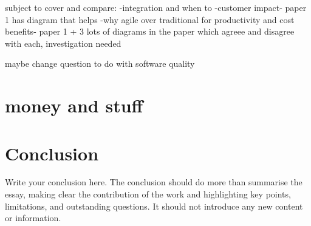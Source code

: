 \documentclass{scrartcl}
\begin{document}
 

subject to cover and compare:
-integration and when to 
-customer impact- paper 1 has diagram that helps
-why agile over traditional for productivity and cost benefits- paper 1 + 3
lots of diagrams in the paper which agreee and disagree with each, investigation needed

maybe change question to do with software quality


\section{money and stuff}






\section{Conclusion}

Write your conclusion here. The conclusion should do more than summarise the essay, making clear the contribution of the work and highlighting key points, limitations, and outstanding questions. It should not introduce any new content or information.



\end{document}
